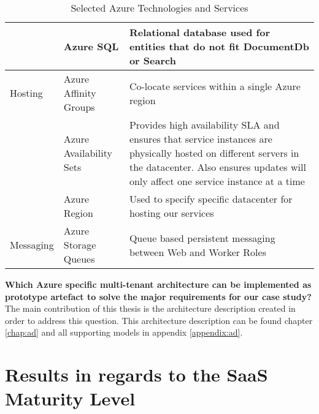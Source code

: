 \begin{table}[htp]
\begin{tabularx}{\textwidth}{|p{1.9cm}|p{3cm}|X|}
               & Azure SQL               & Relational database used for entities that do not fit DocumentDb or Search                                                                                                                            \\\hline
Hosting        & Azure Affinity Groups   & Co-locate services within a single Azure region                                                                                                                                                       \\\hline
               & Azure Availability Sets & Provides high availability SLA and ensures that service instances are physically hosted on different servers in the datacenter. Also ensures updates will only affect one service instance at a time \\\hline
               & Azure Region            & Used to specify specific datacenter for hosting our services                                                                                                                                          \\\hline
Messaging      & Azure Storage Queues    & Queue based persistent messaging between Web and Worker Roles                                                                                                                                         \\\hline                                                                      
\end{tabularx}
\caption{Selected Azure Technologies and Services}
\label{tab:technologiesselected}
\end{table}
\vfill

\textbf{Which Azure specific multi-tenant architecture can be implemented as prototype artefact to solve the major requirements for our case study?}
\\
The main contribution of this thesis is the architecture description created in order to address this question. This architecture description can be found chapter \ref{chap:ad} and all supporting models in appendix \ref{appendix:ad}.

\section{Results in regards to the SaaS Maturity Level}

